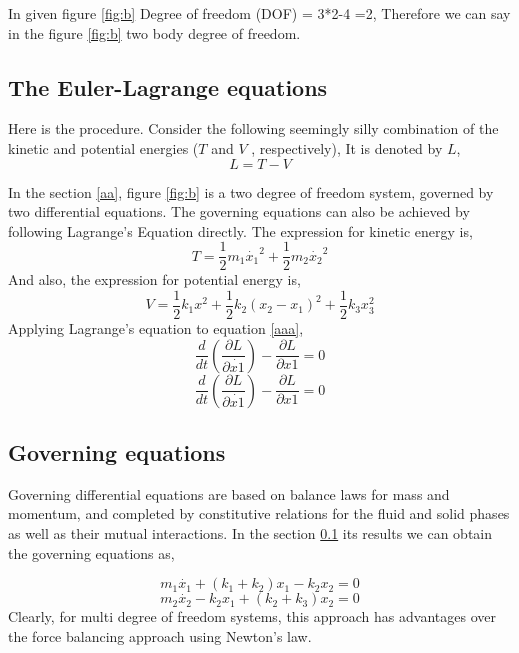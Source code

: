 \documentclass[extendedabs]{AAVL}
\begin{document}
In given figure \ref{fig:b} Degree of freedom (DOF) = 3*2-4 =2, Therefore we can say in the figure \ref{fig:b} two body degree of freedom.
\subsection{The Euler-Lagrange equations}
\label{ab}
Here is the procedure. Consider the following seemingly silly combination of the kinetic and potential energies ($T$ and $V$ , respectively), It is denoted by $L$,
\begin{equation}
\label{aaa}
    L = T-V
\end{equation}

In the section \ref{aa}, figure \ref{fig:b} is a two degree of freedom system, governed by two differential equations. The governing equations can also be achieved by following Lagrange's Equation directly. The expression for kinetic energy is,
\begin{equation}
    T = \frac{1}{2}m_1\dot{x_1}^2 + \frac{1}{2}m_2\dot{x_2}^2
\end{equation}
And also, the expression for potential energy is,
\begin{equation}
    V = \frac{1}{2}k_1x^2+\frac{1}{2}k_2(x_2-x_1)^2+\frac{1}{2}k_3x_3^2
\end{equation}
Applying Lagrange’s equation to equation \eqref{aaa},
\begin{equation}
    \frac{d}{dt}(\frac{\partial L}{\partial \dot{x1}})-\frac{\partial L}{\partial x1} = 0 
\end{equation}
\begin{equation}
     \frac{d}{dt}(\frac{\partial L}{\partial \dot{x1}})-\frac{\partial L}{\partial x1} = 0
\end{equation}

\subsection{Governing equations}
Governing differential equations are based on balance laws for mass and momentum, and completed by constitutive relations for the fluid and solid phases as well as their mutual interactions. In the section \ref{ab} its results we can obtain the governing equations as,

\begin{equation}
\label{aab}
    m_1\dot{x_1}+(k_1+k_2)x_1-k_2x_2=0
\end{equation}
\begin{equation}
\label{aac}
    m_2\dot{x_2}-k_2x_1+(k_2+k_3)x_2 = 0
\end{equation}
Clearly, for multi degree of freedom systems, this approach has advantages over the force balancing approach
using Newton’s law.
\end{document}
